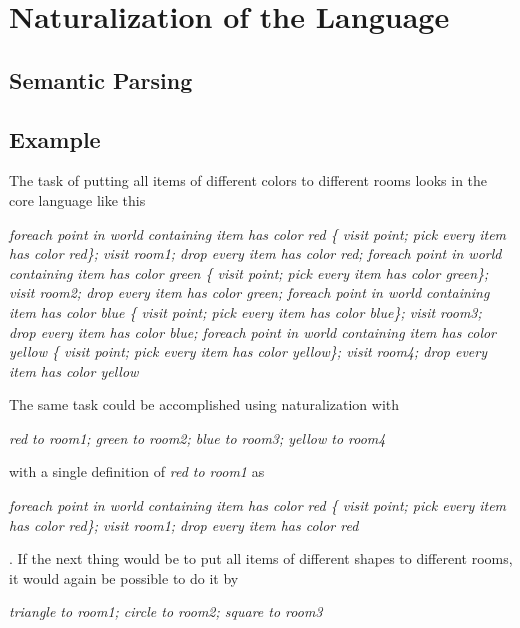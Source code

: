 \section{Naturalization of the Language}


\subsection{Semantic Parsing}


\subsection{Example}


The task of putting all items of different colors to different rooms looks in the core language like this \\
\begin{displayquote}
 \textit{foreach point in world containing item has color red \{ visit point; pick every item has color red\}; visit room1; drop every item has color red; foreach point in world containing item has color green \{ visit point; pick every item has color green\}; visit room2; drop every item has color green; foreach point in world containing item has color blue \{ visit point; pick every item has color blue\}; visit room3; drop every item has color blue; foreach point in world containing item has color yellow \{ visit point; pick every item has color yellow\}; visit room4; drop every item has color yellow} 
\end{displayquote} 
 The same task could be accomplished using naturalization with 
\begin{displayquote} 
 \textit{red to room1; green to room2; blue to room3; yellow to room4}
\end{displayquote} 
  with a single definition of \textit{red to room1} as
  \begin{displayquote}
  \textit{foreach point in world containing item has color red \{ visit point; pick every item has color red\}; visit room1; drop every item has color red}
  \end{displayquote}.
  If the next thing would be to put all items of different shapes to different rooms, it would again be possible to do it by 
\begin{displayquote}  
   \textit{ triangle to room1; circle to room2; square to room3}
   \end{displayquote}
